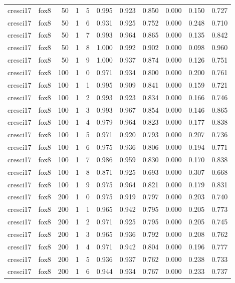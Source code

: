 \begin{tabular}{llrrrrrrrrr}
cresci17 & fox8 & 50 & 1 & 5 & 0.995 & 0.923 & 0.850 & 0.000 & 0.150 & 0.727 \\
cresci17 & fox8 & 50 & 1 & 6 & 0.931 & 0.925 & 0.752 & 0.000 & 0.248 & 0.710 \\
cresci17 & fox8 & 50 & 1 & 7 & 0.993 & 0.964 & 0.865 & 0.000 & 0.135 & 0.842 \\
cresci17 & fox8 & 50 & 1 & 8 & 1.000 & 0.992 & 0.902 & 0.000 & 0.098 & 0.960 \\
cresci17 & fox8 & 50 & 1 & 9 & 1.000 & 0.937 & 0.874 & 0.000 & 0.126 & 0.751 \\
cresci17 & fox8 & 100 & 1 & 0 & 0.971 & 0.934 & 0.800 & 0.000 & 0.200 & 0.761 \\
cresci17 & fox8 & 100 & 1 & 1 & 0.995 & 0.909 & 0.841 & 0.000 & 0.159 & 0.721 \\
cresci17 & fox8 & 100 & 1 & 2 & 0.993 & 0.923 & 0.834 & 0.000 & 0.166 & 0.746 \\
cresci17 & fox8 & 100 & 1 & 3 & 0.993 & 0.967 & 0.854 & 0.000 & 0.146 & 0.865 \\
cresci17 & fox8 & 100 & 1 & 4 & 0.979 & 0.964 & 0.823 & 0.000 & 0.177 & 0.838 \\
cresci17 & fox8 & 100 & 1 & 5 & 0.971 & 0.920 & 0.793 & 0.000 & 0.207 & 0.736 \\
cresci17 & fox8 & 100 & 1 & 6 & 0.975 & 0.936 & 0.806 & 0.000 & 0.194 & 0.771 \\
cresci17 & fox8 & 100 & 1 & 7 & 0.986 & 0.959 & 0.830 & 0.000 & 0.170 & 0.838 \\
cresci17 & fox8 & 100 & 1 & 8 & 0.871 & 0.925 & 0.693 & 0.000 & 0.307 & 0.668 \\
cresci17 & fox8 & 100 & 1 & 9 & 0.975 & 0.964 & 0.821 & 0.000 & 0.179 & 0.831 \\
cresci17 & fox8 & 200 & 1 & 0 & 0.975 & 0.919 & 0.797 & 0.000 & 0.203 & 0.740 \\
cresci17 & fox8 & 200 & 1 & 1 & 0.965 & 0.942 & 0.795 & 0.000 & 0.205 & 0.773 \\
cresci17 & fox8 & 200 & 1 & 2 & 0.971 & 0.925 & 0.795 & 0.000 & 0.205 & 0.745 \\
cresci17 & fox8 & 200 & 1 & 3 & 0.965 & 0.936 & 0.792 & 0.000 & 0.208 & 0.762 \\
cresci17 & fox8 & 200 & 1 & 4 & 0.971 & 0.942 & 0.804 & 0.000 & 0.196 & 0.777 \\
cresci17 & fox8 & 200 & 1 & 5 & 0.936 & 0.937 & 0.762 & 0.000 & 0.238 & 0.733 \\
cresci17 & fox8 & 200 & 1 & 6 & 0.944 & 0.934 & 0.767 & 0.000 & 0.233 & 0.737 \\

\end{tabular}
